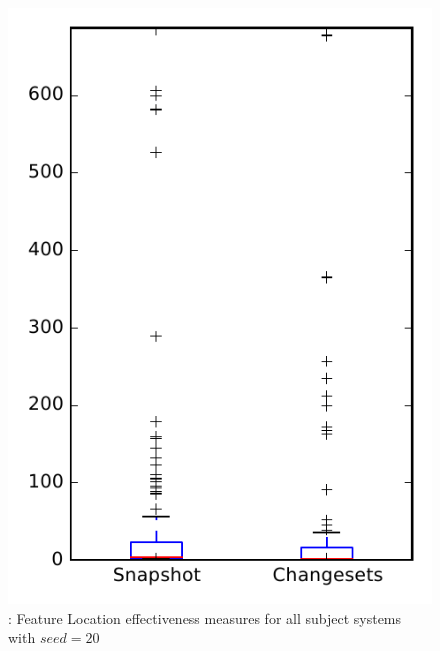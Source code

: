 
\begin{figure}
\centering
\includegraphics[height=0.4\textheight]{figures/flt_seed/rq1_overview_20}
\caption{\rone: Feature Location effectiveness measures for all subject systems with $seed=20$}
\label{fig:flt_seed:rq1:overview}
\end{figure}
